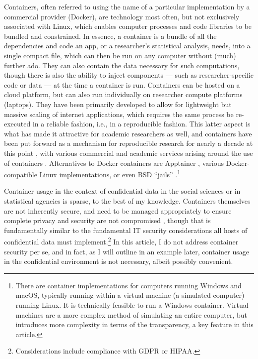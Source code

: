 \documentclass[]{hdsr}
\begin{document}
Containers, often referred to using the name of a particular implementation by a commercial provider (Docker), are technology most often, but not exclusively associated with Linux, which enables computer processes and code libraries to be bundled and constrained. In essence, a container is a bundle of all the dependencies and code an app, or a researcher's statistical analysis, needs, into a single compact file, which can then be run on any computer without (much) further ado. They can also contain the data necessary for such computations, though there is also the ability to inject components --- such as researcher-specific code or data --- at the time a container is run. Containers can be hosted on a cloud platform, but can also run individually on researcher compute platforms (laptops).  They have been primarily developed to allow for lightweight but massive scaling of internet applications, which requires the same process be re-executed in a reliable fashion, i.e., in a reproducible fashion. This latter aspect is what has made it attractive for academic researchers as well, and containers have been put forward as a mechanism for reproducible research for nearly a decade at this point \citep{boettiger_introduction_2015}, with various commercial and academic services arising around the use of containers \citep{clyburne-sherin_computational_2019,chard_toward_2020,brinckman_computing_2018}. Alternatives to Docker containers are Apptainer \citep{contributors_to_the_apptainer_project_apptainer_2025}, various Docker-compatible Linux implementations, or even BSD ``jails'' \citep{the_freebsd_project_chapter_2025}.\footnote{There are container implementations for computers running Windows and macOS, typically running within a virtual machine (a simulated computer) running Linux. It is technically feasible to run a Windows container. Virtual machines are a more complex method of simulating an entire computer, but introduces more complexity in terms of the transparency, a key feature in this article.} 

Container usage in the context of confidential data in the social sciences or in statistical agencies is sparse, to the best of my knowledge. Containers themselves are not inherently secure, and need to be managed appropriately to ensure complete privacy and security are not compromised \citep[see][]{souppaya_application_2017}, though that is fundamentally similar to the fundamental IT security considerations all hosts of confidential data must implement.\footnote{Considerations include compliance with \ac{GDPR} or \ac{HIPAA}.} In this article, I do not address container security per se, and in fact, as I will outline in an example later, container usage in the confidential environment is not necessary, albeit possibly convenient.  
\end{document}
